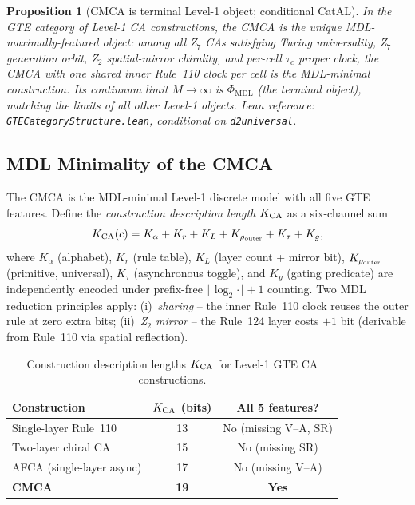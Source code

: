 \documentclass[11pt]{article}
\newtheorem{proposition}[theorem]{Proposition}
\theoremstyle{remark}
\newcommand{\PHIMDL}{\Phi_{\mathrm{MDL}}}
\newcommand{\lean}[1]{%
  \penalty-100
  \begingroup\def\_{\textunderscore\allowbreak}\texttt{#1}\endgroup}
\begin{document}
\begin{proposition}[CMCA is terminal Level-1 object; conditional CatAL]
\label{prop:cmca_terminal}
In the GTE category of Level-1 CA constructions, the CMCA is the unique
MDL-maximally-featured object: among all Z$_7$ CAs satisfying Turing
universality, Z$_7$ generation orbit, Z$_2$ spatial-mirror chirality, and
per-cell $\tau_c$ proper clock, the CMCA with one shared inner Rule~110 clock
per cell is the MDL-minimal construction.  Its continuum limit $M\to\infty$
is $\PHIMDL$ (the terminal object), matching the limits of all other
Level-1 objects.  Lean reference: \lean{GTECategoryStructure.lean}, conditional
on \lean{d2\_universal}.
\end{proposition}

\subsection{MDL Minimality of the CMCA}
\label{ssec:cmca_mdl_minimal}

The CMCA is the MDL-minimal Level-1 discrete model with all five GTE features.
Define the \emph{construction description length} $K_{\rm CA}$ as a six-channel sum
\begin{equation}
\label{eq:kca}
K_{\rm CA}(c) = K_\alpha + K_r + K_L + K_{\rho_{\rm outer}} + K_\tau + K_g,
\end{equation}
where $K_\alpha$ (alphabet), $K_r$ (rule table), $K_L$ (layer count + mirror bit),
$K_{\rho_{\rm outer}}$ (primitive, universal), $K_\tau$ (asynchronous toggle),
and $K_g$ (gating predicate) are independently encoded under prefix-free
$\lfloor\log_2\cdot\rfloor+1$ counting.  Two MDL reduction principles apply:
(i)~\emph{sharing} -- the inner Rule~110 clock reuses the outer rule at zero extra bits;
(ii)~\emph{Z$_2$ mirror} -- the Rule~124 layer costs $+1$ bit (derivable from Rule~110
via spatial reflection).

\begin{table}[h]
\centering
\small
\caption{Construction description lengths $K_{\rm CA}$ for Level-1 GTE CA constructions.}
\label{tab:kca}
\begin{tabular}{lcc}
\toprule
Construction & $K_{\rm CA}$ (bits) & All 5 features? \\
\midrule
Single-layer Rule~110 & 13 & No (missing V--A, SR) \\
Two-layer chiral CA & 15 & No (missing SR) \\
AFCA (single-layer async) & 17 & No (missing V--A) \\
\textbf{CMCA} & \textbf{19} & \textbf{Yes} \\
\bottomrule
\end{tabular}
\end{table}
\end{document}
